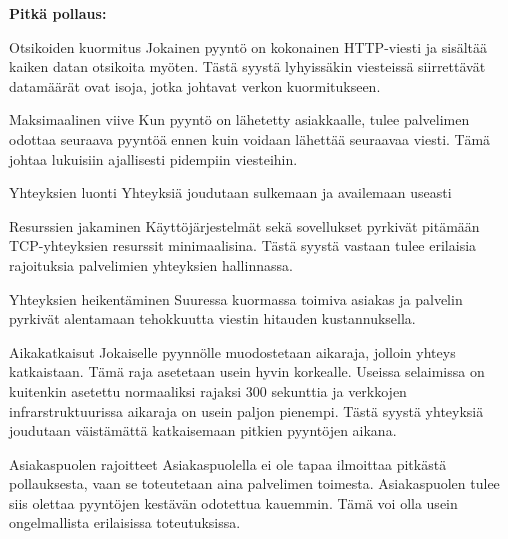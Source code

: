 \documentclass[utf8]{gradu3}
\begin{document}
\textbf{Pitkä pollaus:}
\begin{desclist}
\item[Otsikoiden  kuormitus] Jokainen pyyntö on kokonainen HTTP-viesti ja sisältää kaiken datan otsikoita myöten. Tästä syystä lyhyissäkin viesteissä siirrettävät datamäärät ovat isoja, jotka johtavat verkon kuormitukseen.
\item[Maksimaalinen viive] Kun pyyntö on lähetetty asiakkaalle, tulee palvelimen odottaa seuraava pyyntöä ennen kuin voidaan lähettää seuraavaa viesti. Tämä johtaa lukuisiin ajallisesti pidempiin viesteihin.
\item[Yhteyksien luonti] Yhteyksiä joudutaan sulkemaan ja availemaan useasti
\item[Resurssien jakaminen] Käyttöjärjestelmät sekä sovellukset pyrkivät pitämään TCP-yhteyksien resurssit minimaalisina. Tästä syystä vastaan tulee erilaisia rajoituksia palvelimien yhteyksien hallinnassa.
\item[Yhteyksien heikentäminen] Suuressa kuormassa toimiva asiakas ja palvelin pyrkivät alentamaan tehokkuutta viestin hitauden kustannuksella.
\item[Aikakatkaisut] Jokaiselle pyynnölle muodostetaan aikaraja, jolloin yhteys katkaistaan. Tämä raja asetetaan usein hyvin korkealle. Useissa selaimissa on kuitenkin asetettu normaaliksi rajaksi 300 sekunttia ja verkkojen infrarstruktuurissa aikaraja on usein paljon pienempi. Tästä syystä yhteyksiä joudutaan väistämättä katkaisemaan pitkien pyyntöjen aikana.
\item[Asiakaspuolen rajoitteet] Asiakaspuolella ei ole tapaa ilmoittaa pitkästä pollauksesta, vaan se toteutetaan aina palvelimen toimesta. Asiakaspuolen tulee siis olettaa pyyntöjen kestävän odotettua kauemmin. Tämä voi olla usein ongelmallista erilaisissa toteutuksissa.
\end{desclist}
\end{document}
